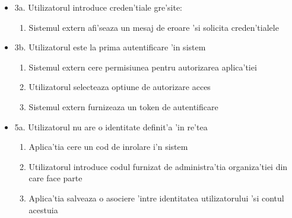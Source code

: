 \documentclass[12pt,a4paper,twoside]{report}
\begin{document}
\begin{itemize}
    \item 3a. Utilizatorul introduce creden'tiale gre'site:
        \begin{enumerate}
            \item Sistemul extern afi'seaza un mesaj de eroare 'si solicita creden'tialele
        \end{enumerate}
    \item 3b. Utilizatorul este la prima autentificare 'in sistem
        \begin{enumerate}
            \item Sistemul extern cere permisiunea pentru autorizarea aplica'tiei
            \item Utilizatorul selecteaza optiune de autorizare acces
            \item Sistemul extern furnizeaza un token de autentificare
        \end{enumerate}
    \item 5a. Utilizatorul nu are o identitate definit'a 'in re'tea
        \begin{enumerate}
            \item Aplica'tia cere un cod de inrolare i'n sistem
            \item Utilizatorul introduce codul furnizat de administra'tia organiza'tiei din care face parte
            \item Aplica'tia salveaza o asociere 'intre identitatea utilizatorului 'si contul acestuia
        \end{enumerate}
\end{itemize}
\end{document}
